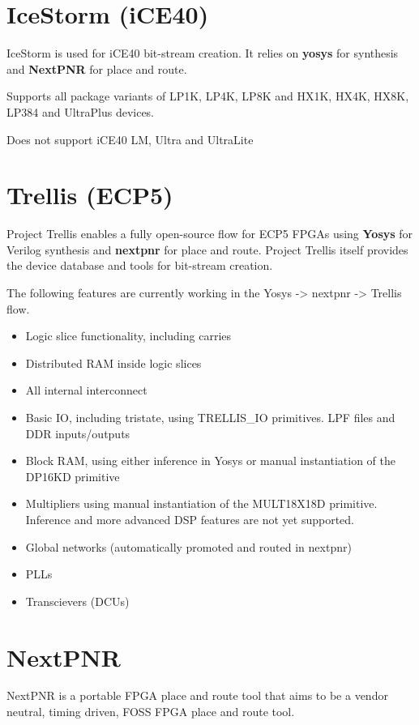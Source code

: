 
\section{IceStorm (iCE40)}
IceStorm \cite{project-icestorm} is used for iCE40 bit-stream creation. It relies on \textbf{yosys} for synthesis and \textbf{NextPNR} for place and route.

Supports all package variants of LP1K, LP4K, LP8K and HX1K, HX4K, HX8K, LP384 and UltraPlus devices.

Does not support iCE40 LM, Ultra and UltraLite
\section{Trellis (ECP5)}
Project Trellis enables a fully open-source flow for ECP5 FPGAs using \textbf{Yosys} for Verilog synthesis and \textbf{nextpnr} for place and route. Project Trellis itself provides the device database and tools for bit-stream creation.

The following features are currently working in the Yosys -> nextpnr -> Trellis flow.

\begin{itemize}
\item Logic slice functionality, including carries
\item Distributed RAM inside logic slices
\item All internal interconnect
\item Basic IO, including tristate, using TRELLIS\_IO primitives. LPF files and DDR inputs/outputs
\item Block RAM, using either inference in Yosys or manual instantiation of the DP16KD primitive
\item Multipliers using manual instantiation of the MULT18X18D primitive. 
\newline Inference and more advanced DSP features are not yet supported.
\item Global networks (automatically promoted and routed in nextpnr)
\item PLLs
\item Transcievers (DCUs)
\end{itemize}

\section{NextPNR} 
    
NextPNR is a portable FPGA place and route tool that aims to be a vendor neutral, timing driven, FOSS FPGA place and route tool.

